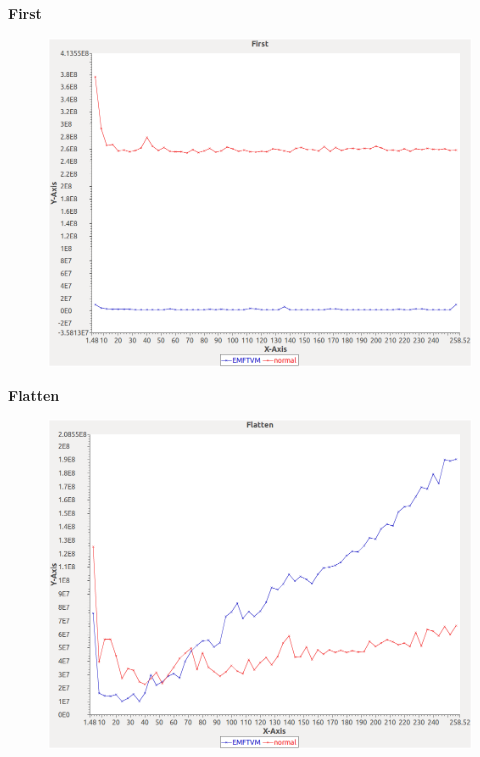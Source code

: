\noindent\textbf{First}

\begin{figure}[h]
\centering
\includegraphics[width=\textwidth]{graphs/orderedset/First}
\end{figure}
\pagebreak

\noindent\textbf{Flatten}

\begin{figure}[h]
\centering
\includegraphics[width=\textwidth]{graphs/orderedset/Flatten}
\end{figure}
\pagebreak

